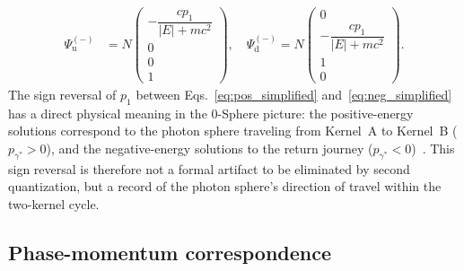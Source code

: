 \documentclass[%
 reprint, amsmath,amssymb, aps, prb, ]{revtex4-2}
\numberwithin{equation}{section}
\begin{document}
\begin{align}
\Psi^{(-)}_{\mathrm{u}}&= N\!\begin{pmatrix}-\dfrac{cp_1}{|E|+mc^2}\\0\\0\\1\end{pmatrix},\quad
\Psi^{(-)}_{\mathrm{d}}= N\!\begin{pmatrix}0\\-\dfrac{cp_1}{|E|+mc^2}\\1\\0\end{pmatrix}.
\label{eq:neg_simplified}
\end{align}
The sign reversal of $p_1$ between Eqs.~\eqref{eq:pos_simplified} and~\eqref{eq:neg_simplified} has a direct physical meaning in the 0-Sphere picture: the positive-energy solutions correspond to the photon sphere traveling from Kernel~A to Kernel~B ($p_{\gamma^*}>0$), and the negative-energy solutions to the return journey ($p_{\gamma^*}<0$)~\cite{hanamura07}. This sign reversal is therefore not a formal artifact to be eliminated by second quantization, but a record of the photon sphere's direction of travel within the two-kernel cycle.

\clearpage

\subsection{Phase-momentum correspondence}
\label{app:phase_table}
\end{document}
